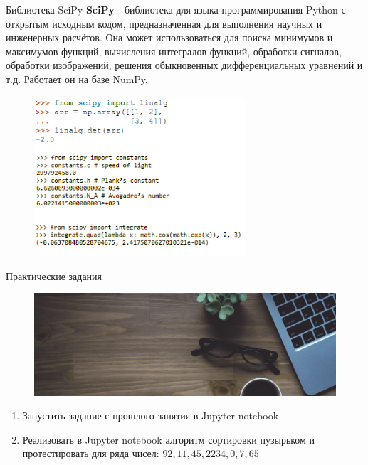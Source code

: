 \documentclass[8pt,pdf,hyperref={unicode}, xcolor=dvipsnames, fleqn]{beamer}
\begin{document}
\begin{frame}{Библиотека SciPy}
\textbf{SciPy} - библиотека для языка программирования Python с открытым исходным кодом, предназначенная для выполнения научных и инженерных расчётов. Она может использоваться для поиска минимумов и максимумов функций, вычисления интегралов функций, обработки сигналов, обработки изображений, решения обыкновенных дифференциальных уравнений и т.д. Работает он на базе NumPy.

\begin{figure}
	\includegraphics[width=0.7\textwidth]{Images/scipy.png}
\end{figure}

\end{frame}
\begin{frame}{Практические задания}


\begin{figure}
	\includegraphics[width=1.0\textwidth]{Images/codingtime.jpg}
\end{figure}

\begin{enumerate}
	\item Запустить задание с прошлого занятия в Jupyter notebook
	\item Реализовать в Jupyter notebook алгоритм сортировки пузырьком и протестировать для ряда чисел: $ 92,11,45,2234,0,7,65 $
\end{enumerate}

\end{frame}
\end{document}
